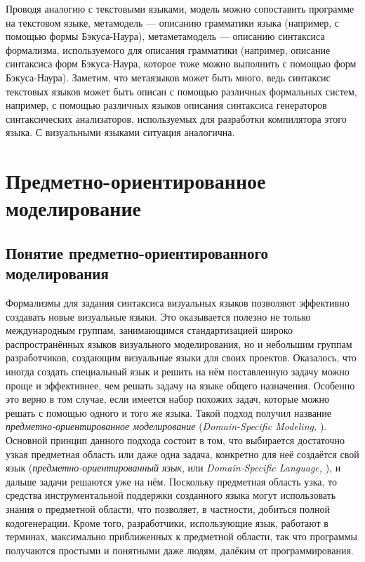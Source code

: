 Проводя аналогию с текстовыми языками, модель можно сопоставить программе на 
текстовом языке, метамодель --- описанию грамматики языка (например, с помощью
формы Бэкуса-Наура), метаметамодель --- описанию синтаксиса формализма, 
используемого для описания грамматики (например, описание синтаксиса форм 
Бэкуса-Наура, которое тоже можно выполнить с помощью форм Бэкуса-Наура). 
Заметим, что метаязыков может быть много, ведь синтаксис текстовых языков может 
быть описан с помощью различных формальных систем, например, с помощью различных 
языков описания синтаксиса генераторов синтаксических анализаторов, используемых 
для разработки компилятора этого языка. С визуальными языками ситуация 
аналогична.

\section{Предметно-ориентированное моделирование}
\subsection{Понятие предметно-ориентированного моделирования}
Формализмы для задания синтаксиса визуальных языков позволяют эффективно 
создавать новые визуальные языки. Это оказывается полезно не только 
международным группам, занимающимся стандартизацией широко распространённых 
языков визуального моделирования, но и небольшим группам разработчиков, 
создающим визуальные языки для своих проектов. Оказалось, что иногда создать 
специальный язык и решить на нём поставленную задачу можно проще и эффективнее, 
чем решать задачу на языке общего назначения. Особенно это верно в том случае, 
если имеется набор похожих задач, которые можно решать с помощью одного и того 
же языка. Такой подход получил название \textit{предметно-ориентированное моделирование} 
(\textit{Domain-Specific Modeling, }). Основной принцип данного подхода состоит в том, 
что выбирается достаточно узкая предметная область или даже одна задача, 
конкретно для неё создаётся свой язык (\textit{предметно-ориентированный язык}, или 
\textit{Domain-Specific Language, }), и дальше задачи решаются уже на нём. Поскольку 
предметная область узка, то средства инструментальной поддержки созданного языка 
могут использовать знания о предметной области, что позволяет, в частности, 
добиться полной кодогенерации. Кроме того, разработчики, использующие язык, 
работают в терминах, максимально приближенных к предметной области, так что 
программы получаются простыми и понятными даже людям, далёким от 
программирования.

